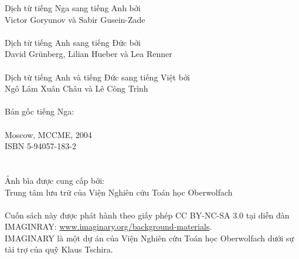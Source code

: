 \clearpage
\null\vfill
\noindent
Dịch từ tiếng Nga sang tiếng Anh bởi \\
\null\quad Victor Goryunov và Sabir Gusein-Zade\\
\\
Dịch từ tiếng Anh sang tiếng Đức bởi \\
\null\quad David Gr\"{u}nberg, Lilian Hueber và Lea Renner\\
\\
Dịch từ tiếng Anh và tiếng Đức sang tiếng Việt bởi \\
\null\quad Ngô Lâm Xuân Châu và Lê Công Trình \\
\\
Bản gốc tiếng Nga:\\
\null{}\\
\null\quad Moscow, MCCME, 2004\\
\null\quad ISBN 5-94057-183-2\\
\\
\\
Ảnh bìa được cung cấp bởi:\\ 
\null\quad Trung tâm lưu trữ của Viện Nghiên cứu Toán học Oberwolfach\\
\\
Cuốn sách này được phát hành theo giấy phép CC BY-NC-SA 3.0 tại diễn đàn IMAGINRAY: \href{http://www.imaginary.org/background-materials}{www.imaginary.org/background-materials}.\\
IMAGINARY là một dự án của Viện Nghiên cứu Toán học Oberwolfach dưới sự tài trợ của quỹ Klaus Tschira.

